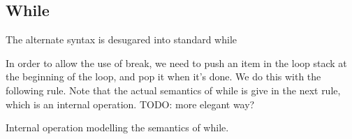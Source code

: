 \documentclass{article}
\begin{document}
\begin{kdefinition}
\begin{module}{}
\begin{kblock}[text]
 \subsection{While} \end{kblock}
\begin{kblock}[text]
 The alternate syntax is desugared into standard while \end{kblock}
\begin{kblock}[text]
 In order to allow the use of break, we need to push an item in the loop stack 
	at the beginning of the loop, and pop it when it's done. We do this with the 
	following rule. Note that the actual semantics of while is give in the next rule, 
	which is an internal operation.
	TODO: more elegant way? \end{kblock}
\begin{kblock}[text]
 Internal operation modelling the semantics of while. \end{kblock}

\begin{syntaxBlock}{}
\end{syntaxBlock}
\begin{kblock}[text]

\end{kblock}
\end{module}
\end{kdefinition}
\end{document}
